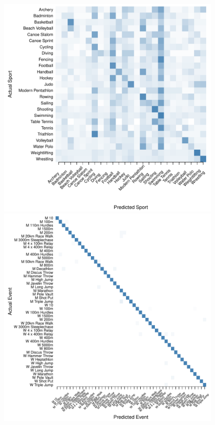 \begin{figure}
\begin{center}
\begin{minipage}{0.20\textwidth}
\begin{center}
      \includegraphics[scale=0.20]{../graphics/sportRF-tst.pdf}
    \end{center}
  \end{minipage}
    \hspace{0.05\textwidth}
    \begin{minipage}{0.20\textwidth}
    \begin{center}
      \includegraphics[scale=0.20]{../graphics/athletesRF-trn.pdf}

\end{center}
\end{minipage}
\end{center}
\end{figure}
